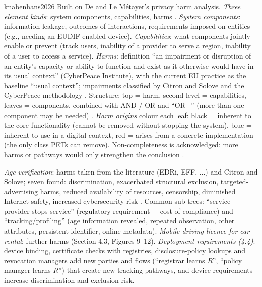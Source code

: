 \begin{papercard}{knabenhans2026}
 Built on De and Le M\'etayer's privacy harm analysis. \emph{Three element kinds}: system components, capabilities, harms . \emph{System components}: information leakage, outcomes of interactions, requirements imposed on entities (e.g., needing an EUDIF-enabled device). \emph{Capabilities}: what components jointly enable or prevent (track users, inability of a provider to serve a region, inability of a user to access a service). \emph{Harms}: definition ``an impairment or disruption of an entity's capacity or ability to function and exist as it otherwise would have in its usual context'' (CyberPeace Institute), with the current EU practice as the baseline ``usual context''; impairments classified by Citron and Solove and the CyberPeace methodology . Structure: top = harm, second level = capabilities, leaves = components, combined with AND / OR and ``OR+'' (more than one component may be needed) . \emph{Harm origins} colour each leaf: black = inherent to the core functionality (cannot be removed without stopping the system), blue = inherent to use in a digital context, red = arises from a concrete implementation (the only class PETs can remove). Non-completeness is acknowledged: more harms or pathways would only strengthen the conclusion .

 \emph{Age verification}: harms taken from the literature (EDRi, EFF, ...) and Citron and Solove; seven found: discrimination, exacerbated structural exclusion, targeted-advertising harms, reduced availability of resources, censorship, diminished Internet safety, increased cybersecurity risk . Common sub-trees: ``service provider stops service'' (regulatory requirement + cost of compliance) and ``tracking/profiling'' (age information revealed, repeated observation, other attributes, persistent identifier, online metadata). \emph{Mobile driving licence for car rental}: further harms (Section 4.3, Figures 9--12). \emph{Deployment requirements (4.4)}: device binding, certificate checks with registries, disclosure-policy lookups and revocation managers add new parties and flows (``registrar learns $R$'', ``policy manager learns $R$'') that create new tracking pathways, and device requirements increase discrimination and exclusion risk.


\end{papercard}
